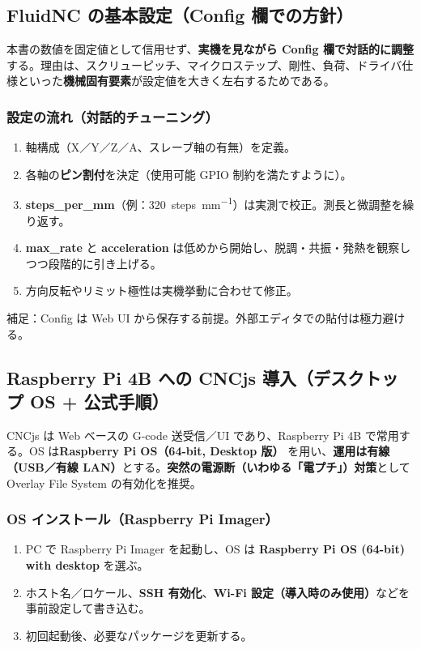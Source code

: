 \documentclass[uplatex,dvipdfmx]{ujarticle}
\begin{document}
\subsection{FluidNC の基本設定（Config 欄での方針）}

本書の数値を固定値として信用せず、\textbf{実機を見ながら Config 欄で対話的に調整}する\cite{fluidnc-config,fluidnc-motion}。理由は、スクリューピッチ、マイクロステップ、剛性、負荷、ドライバ仕様といった\textbf{機械固有要素}が設定値を大きく左右するためである。

\subsubsection*{設定の流れ（対話的チューニング）}
\begin{enumerate}
  \item 軸構成（X／Y／Z／A、スレーブ軸の有無）を定義。
  \item 各軸の\textbf{ピン割付}を決定（使用可能 GPIO 制約を満たすように）。
  \item \textbf{steps\_per\_mm}（例：\SI{320}{steps\per\milli\meter}）は実測で校正。測長と微調整を繰り返す。
  \item \textbf{max\_rate} と \textbf{acceleration} は低めから開始し、脱調・共振・発熱を観察しつつ段階的に引き上げる。
  \item 方向反転やリミット極性は実機挙動に合わせて修正。
\end{enumerate}

\noindent 補足：Config は Web UI から保存する前提。外部エディタでの貼付は極力避ける。

\subsection{Raspberry Pi 4B への CNCjs 導入（デスクトップ OS + 公式手順）}

CNCjs\cite{cncjs-site} は Web ベースの G-code 送受信／UI であり、Raspberry Pi 4B で常用する。OS は\textbf{Raspberry Pi OS（64-bit, Desktop 版）} \cite{rpi-os}を用い、\textbf{運用は有線（USB／有線 LAN）}とする。\textbf{突然の電源断（いわゆる「電プチ」）対策}として Overlay File System の有効化を推奨\cite{rpi-config,rpi-overlay-wp}。
\subsubsection*{OS インストール（Raspberry Pi Imager）}
\begin{enumerate}
  \item PC で Raspberry Pi Imager を起動し\cite{rpi-imager}、OS は \textbf{Raspberry Pi OS (64-bit) with desktop} を選ぶ。
  \item ホスト名／ロケール、\textbf{SSH 有効化}、\textbf{Wi-Fi 設定（導入時のみ使用）}などを事前設定して書き込む\cite{rpi-imager-adv}。
  \item 初回起動後、必要なパッケージを更新する。
\end{enumerate}
\end{document}
